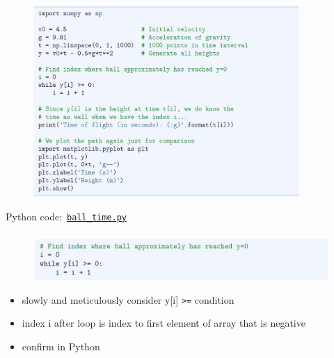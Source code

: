 \documentclass[english,14pt]{beamer}
\begin{document}

\begin{frame}[fragile]

\frametitle{}

\begin{figure}[ht]
	\centering
	\includegraphics[width=0.9\textwidth]{figures/LLp65a}
\end{figure}
\vspace*{-3mm}
Python code:~\href{https://github.com/slgit/prog4comp_2/blob/master/py36-src/ball_time.py}{\texttt{ball\_time.py}}

\end{frame}


\begin{frame}[fragile]

\frametitle{}

\begin{figure}[ht]
	\centering
	\includegraphics[width=\textwidth]{figures/LLp65b}
\end{figure}

\begin{itemize}
	\item slowly and meticulously consider y[i] \verb+>=+  condition
	\item index i after loop is index to first element of array that is negative
	\item confirm in Python
\end{itemize}

\end{frame}
\end{document}
